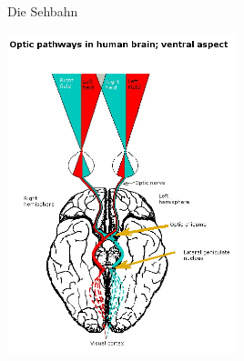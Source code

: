 \documentclass{beamer}
\begin{document}

\begin{frame}{Die Sehbahn}

\begin{center}
    \includegraphics[width=0.5\textwidth]{Optic_processing_human_brain.jpg}
\end{center}
\end{frame}
\end{document}
